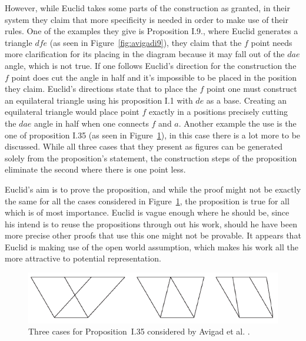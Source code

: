 \documentclass[]{interact}
\theoremstyle{plain}
\theoremstyle{definition}
\theoremstyle{remark}
\begin{document}
However, while Euclid takes
some parts of the construction as granted, in their system they claim
that more specificity is needed in order to make use of their rules.
One of the examples they give is Proposition I.9., where
Euclid generates a triangle $dfe$ (as seen in
Figure~\ref{fig:avigadi9}), they claim that the $f$ point needs more
clarification for its placing in the diagram because it may fall out
of the $dae$ angle, which is not true. If one follows Euclid's
direction for the construction the $f$ point does cut the angle in
half and it's impossible to be placed in the position they claim.
Euclid's directions state that to place the $f$ point one must
construct an equilateral triangle using his proposition I.1 with $de$
as a base. Creating an equilateral triangle would place point $f$
exactly in a positions precisely cutting the $dae$ angle in half when
one connects $f$ and $a$. Another example the use is the one of
proposition I.35 (as seen in Figure~\ref{fig:avigadi35}), in this case
there is a lot more to be discussed. While all three cases that they
present as figures can be generated solely from the proposition's
statement, the construction steps of the proposition eliminate the
second where there is one point less.

Euclid's aim is to prove the proposition, and while the proof
might not be exactly the same for all the cases considered in
Figure~\ref{fig:avigadi35}, the proposition is true for all which is
of most importance. Euclid is vague enough where he should be, since
his intend is to reuse the propositions through out his work, should
he have been more precise other proofs that use this one might not be
provable. It appears that Euclid is making use of the open world
assumption, which makes his work all the more attractive to potential
representation.

\begin{figure}[h]
  \centering
  \includegraphics[scale=0.7]{avigad-fig9-I35}
  \caption[Avigad et al Approach I.35]{Three cases for
    Proposition~I.35 considered by Avigad et al. \cite{avigad-etal:2009}.}
  \label{fig:avigadi35}
\end{figure}
\end{document}

